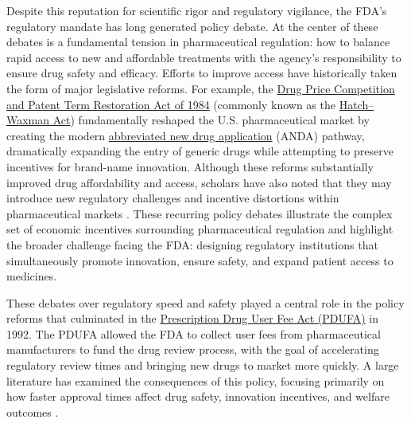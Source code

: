Despite this reputation for scientific rigor and regulatory vigilance, the FDA’s regulatory mandate has long generated policy debate. At the center of these debates is a fundamental tension in pharmaceutical regulation: how to balance rapid access to new and affordable treatments with the agency’s responsibility to ensure drug safety and efficacy. Efforts to improve access have historically taken the form of major legislative reforms. For example, the \href{https://www.congress.gov/bill/98th-congress/house-bill/3605}{Drug Price Competition and Patent Term Restoration Act of 1984} (commonly known as the \href{https://www.fda.gov/drugs/abbreviated-new-drug-application-anda/hatch-waxman-letters}{Hatch–Waxman Act}) fundamentally reshaped the U.S. pharmaceutical market by creating the modern \href{https://www.fda.gov/drugs/types-applications/abbreviated-new-drug-application-anda}{abbreviated new drug application} (ANDA) pathway, dramatically expanding the entry of generic drugs while attempting to preserve incentives for brand-name innovation. Although these reforms substantially improved drug affordability and access, scholars have also noted that they may introduce new regulatory challenges and incentive distortions within pharmaceutical markets \parencite{mehlHatchWaxmanActMarket2006}. These recurring policy debates illustrate the complex set of economic incentives surrounding pharmaceutical regulation and highlight the broader challenge facing the FDA: designing regulatory institutions that simultaneously promote innovation, ensure safety, and expand patient access to medicines.

These debates over regulatory speed and safety played a central role in the policy reforms that culminated in the \href{https://www.fda.gov/industry/fda-user-fee-programs/prescription-drug-user-fee-amendments}{Prescription Drug User Fee Act (PDUFA)} in 1992. The PDUFA allowed the FDA to collect user fees from pharmaceutical manufacturers to fund the drug review process, with the goal of accelerating regulatory review times and bringing new drugs to market more quickly. A large literature has examined the consequences of this policy, focusing primarily on how faster approval times affect drug safety, innovation incentives, and welfare outcomes \parencite{olsonRiskWeBear2008}.

